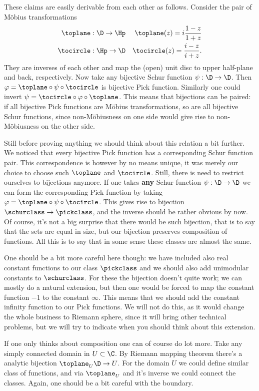 These claims are easily derivable from each other as follows. Consider the pair of Möbius transformations
\begin{eqnarray*}
	\toplane : \D \to \Hp & & \toplane (z) = i \frac{1 - z}{1 + z} \\
	\tocircle : \Hp \to \D & & \tocircle (z) = \frac{i - z}{i + z}.
\end{eqnarray*}
They are inverses of each other and map the (open) unit disc to upper half-plane and back, respectively. Now take any bijective Schur function $\psi : \D \to \D$. Then $\varphi = \toplane \circ \psi \circ \tocircle$ is bijective Pick function. Similarly one could invert $\psi = \tocircle \circ \varphi \circ \toplane$. This means that bijections can be paired: if all bijective Pick functions are Möbius transformations, so are all bijective Schur functions, since non-Möbiusness on one side would give rise to non-Möbiusness on the other side.

Still before proving anything we should think about this relation a bit further. We noticed that every bijective Pick function has a corresponding Schur function pair. This correspondence is however by no means unique, it was merely our choice to choose such $\toplane$ and $\tocircle$. Still, there is need to restrict ourselves to bijections anymore. If one takes \textbf{any} Schur function $\psi : \D \to \D$ we can form the corresponding Pick function by taking $\varphi = \toplane \circ \psi \circ \tocircle$. This gives rise to bijection $\schurclass \to \pickclass$, and the inverse should be rather obvious by now. Of course, it's not a big surprise that there would be such bijection, that is to say that the sets are equal in size, but our bijection preserves composition of functions. All this is to say that in some sense these classes are almost the same.

One should be a bit more careful here though: we have included also real constant functions to our class $\pickclass$ and we should also add unimodular constants to $\schurclass$. For these the bijection doesn't quite work; we can mostly do a natural extension, but then one would be forced to map the constant function $-1$ to the constant $\infty$. This means that we should add the constant infinity function to our Pick functions. We will not do this, as it would change the whole business to Riemann sphere, since it will bring other technical problems, but we will try to indicate when you should think about this extension.

If one only thinks about composition one can of course do lot more. Take any simply connected domain in $U \subset \C$. By Riemann mapping theorem there's a analytic bijection $\toplane_{U} \D \to U$. For the domain $U$ we could define similar class of functions, and via $\toplane_{U}$ and it's inverse we could connect the classes. Again, one should be a bit careful with the boundary.

